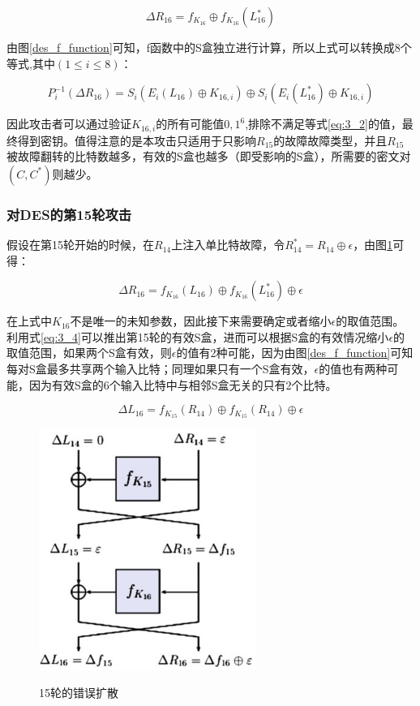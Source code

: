 \documentclass[a4paper,12pt]{article}
\begin{document}
\begin{CJK}{UTF8}{gkai}
\begin{equation}
\label{eq:3_1}
\Delta R_{16} = f_{K_{16}} \oplus f_{K_{16}}(L_{16}^*)
\end{equation}

由图\ref{des_f_function}可知，f函数中的S盒独立进行计算，所以上式可以转换成8个等式,其中$(1 \leq i \leq 8)$：

\begin{equation}
\label{eq:3_2}
P_i^{-1}(\Delta R_{16}) = S_i(E_i(L_{16}) \oplus K_{16,i}) \oplus S_i(E_i(L_{16}^*) \oplus K_{16,i})
\end{equation}

因此攻击者可以通过验证$K_{16,i}$的所有可能值${0,1}^6$,排除不满足等式\ref{eq:3_2}的值，最终得到密钥。值得注意的是本攻击只适用于只影响$R_{15}$的故障故障类型，并且$R_{15}$被故障翻转的比特数越多，有效的S盒也越多（即受影响的S盒），所需要的密文对$(C,C^*)$则越少。

\subsubsection{对DES的第15轮攻击}
假设在第15轮开始的时候，在$R_{14}$上注入单比特故障，令$R_{14}^*=R_{14} \oplus \epsilon$，由图\ref{des_error_propagation_15_round}可得：

\begin{equation}
\label{eq:3_3}
\Delta R_{16} = f_{K_{16}}(L_{16}) \oplus f_{K_{16}}(L_{16}^*) \oplus \epsilon
\end{equation}

在上式中$K_{16}$不是唯一的未知参数，因此接下来需要确定或者缩小$\epsilon$的取值范围。利用式\ref{eq:3_4}可以推出第15轮的有效S盒，进而可以根据S盒的有效情况缩小$\epsilon$的取值范围，如果两个S盒有效，则$\epsilon$的值有2种可能，因为由图\ref{des_f_function}可知每对S盒最多共享两个输入比特；同理如果只有一个S盒有效，$\epsilon$的值也有两种可能，因为有效S盒的6个输入比特中与相邻S盒无关的只有2个比特。

\begin{equation}
\label{eq:3_4}
\Delta L_{16} = f_{K_{15}}(R_{14}) \oplus f_{K_{15}}(R_{14}) \oplus \epsilon
\end{equation}

\begin{figure}
\centering
\caption{15轮的错误扩散}
\includegraphics[width=200pt]{des_15_round_propagation.jpg}
\label{des_error_propagation_15_round}
\end{figure}


\end{CJK}
\end{document}
